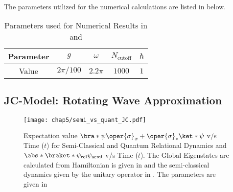 The parameters utilized for the numerical calculations are listed in  below.
\begin{table}[ht]
    \centering
    \label{tab:numerical_values_linear}
        \begin{tabular}{|c|c|c|c|c|}
            \hline
            Parameter & $g$ & $\omega$ & $N_{\text{cutoff}}$ & $\hbar$ \\
            \hline
            Value & $2\pi/100$ & $2.2\pi$ & $1000$ & $1$ \\
            \hline
        \end{tabular}
    \caption{Parameters used for Numerical Results in  and 
    }
\end{table}





\subsection*{JC-Model: Rotating Wave Approximation}
\begin{figure}[!h]
    \centering
    \texttt{[image: chap5/semi\_vs\_quant\_JC.pdf]}
    \caption{
    Expectation value
        \(\bra*{\psi} \oper{\sigma}_x + \oper{\sigma}_z \ket*{\psi}\) v/s Time ($t$) for Semi-Classical and Quantum Relational Dynamics
    and \(\abs*{\braket*{\psi_{\mathrm{rel}}}{\psi_{\mathrm{semi}}}}\) v/s Time ($t$). The Global Eigenstates are calculated from 
    Hamiltonian is given in  and the semi-classical dynamics given by the unitary operator in . The parameters 
    are given in 
    }
    \label{fig:chap5_JCM_semi_vs_quant}
\end{figure}


